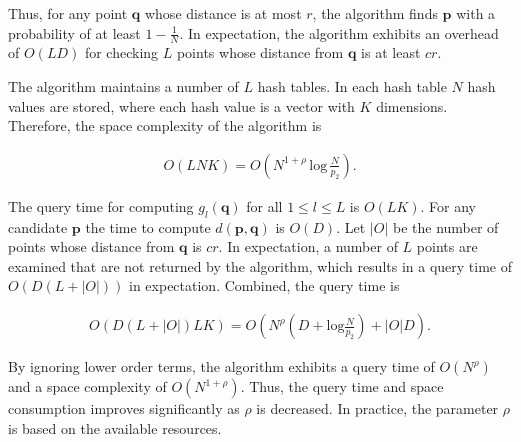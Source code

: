 \documentclass[../../../main.tex]{subfiles}
\begin{document}
Thus, for any point $\bm{q}$ whose distance is at most $r$, the algorithm finds $\bm{p}$ with a probability of at least $1-\frac{1}{N}$. In expectation, the algorithm exhibits an overhead of $O(LD)$ for checking $L$ points whose distance from $\bm{q}$ is at least $cr$.

The algorithm maintains a number of $L$ hash tables. In each hash table $N$ hash values are stored, where each hash value is a vector with $K$ dimensions. Therefore, the space complexity of the algorithm is 

\begin{align*}
    O(LNK) = O(N^{1+\rho} \, \text{log} \, \frac{N}{p_2}).
\end{align*}

The query time for computing $g_l(\bm{q})$ for all $1 \leq l \leq L$ is $O(LK)$. For any candidate $\bm{p}$ the time to compute $d(\bm{p}, \bm{q})$ is $O(D)$. Let $|O|$ be the number of points whose distance from $\bm{q}$ is $cr$. In expectation, a number of $L$ points are examined that are not returned by the algorithm, which results in a query time of $O(D(L + |O|))$ in expectation. Combined, the query time is

\begin{align*}
    O(D(L + |O|) LK) = O(N^\rho (D + \text{log} \frac{N}{p_2}) + |O| D).
\end{align*}

By ignoring lower order terms, the algorithm exhibits a query time of $O(N^\rho)$ and a space complexity of $O(N^{1+\rho})$. Thus, the query time and space consumption improves significantly as $\rho$ is decreased. In practice, the parameter $\rho$ is based on the available resources.
\end{document}
